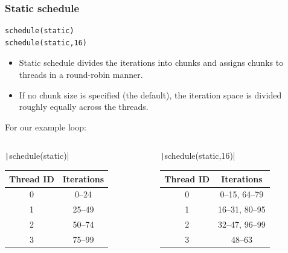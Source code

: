 \documentclass[aspectratio=169]{beamer}
\begin{document}
\begin{frame}[fragile]
\frametitle{Static schedule}
\begin{verbatim}
schedule(static)
schedule(static,16)
\end{verbatim}

\begin{itemize}
\item Static schedule divides the iterations into chunks and assigns chunks to threads in a round-robin manner.
\item If no chunk size is specified (the default), the iteration space is divided roughly equally across the threads.
\end{itemize}
For our example loop:
\begin{columns}
\begin{column}{0.5\textwidth}
  \texttt|schedule(static)|
  \begin{tabular}{cc}
  \toprule
  Thread ID & Iterations \\
  \midrule
  0 &  0--24 \\
  1 & 25--49 \\
  2 & 50--74 \\
  3 & 75--99 \\
  \bottomrule
  \end{tabular}
\end{column}

\begin{column}{0.5\textwidth}
  \texttt|schedule(static,16)|
  \begin{tabular}{cc}
  \toprule
  Thread ID & Iterations \\
  \midrule
  0 &  0--15, 64--79 \\
  1 & 16--31, 80--95 \\
  2 & 32--47, 96--99 \\
  3 & 48--63 \\
  \bottomrule
  \end{tabular}
\end{column}
\end{columns}

\end{frame}
\end{document}
